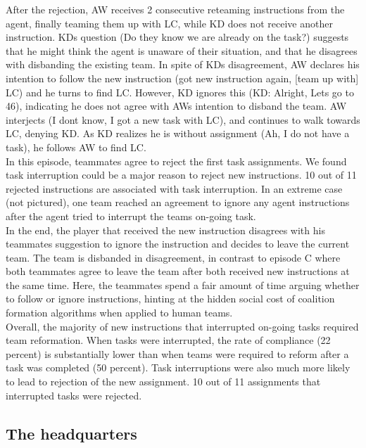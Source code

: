 After the rejection, AW receives 2 consecutive reteaming instructions from the agent, finally teaming them up with LC, while KD does not receive another instruction. KDs question (Do they know we are already on the task?) suggests that he might think the agent is unaware of their situation, and that he disagrees with disbanding the existing team. In spite of KDs disagreement, AW declares his intention to follow the new instruction (got new instruction again, [team up with] LC) and he turns to find LC. However, KD ignores this (KD: Alright, Lets go to 46), indicating he does not agree with AWs intention to disband the team. AW interjects (I dont know, I got a new task with LC), and continues to walk towards LC, denying KD. As KD realizes he is without assignment (Ah, I do not have a task), he follows AW to find LC. \\

In this episode, teammates agree to reject the first task assignments. We found task interruption could be a major reason to reject new instructions. 10 out of 11 rejected instructions are associated with task interruption. In an extreme case (not pictured), one team reached an agreement to ignore any agent instructions after the agent tried to interrupt the teams on-going task. \\

In the end, the player that received the new instruction disagrees with his teammates suggestion to ignore the instruction and decides to leave the current team. The team is disbanded in disagreement, in contrast to episode C where both teammates agree to leave the team after both received new instructions at the same time. Here, the teammates spend a fair amount of time arguing whether to follow or ignore instructions, hinting at the hidden social cost of coalition formation algorithms when applied to human teams. \\

Overall, the majority of new instructions that interrupted on-going tasks required team reformation. When tasks were interrupted, the rate of compliance (22 percent) is substantially lower than when teams were required to reform after a task was completed (50 percent). Task interruptions were also much more likely to lead to rejection of the new assignment. 10 out of 11 assignments that interrupted tasks were rejected.\\

\subsection{The headquarters}

